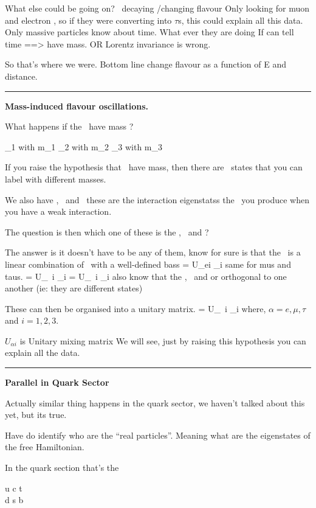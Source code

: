 {What else could be going on?
\nus\ decaying /changing flavour
Only looking for muon and electron \nus, so if they were converting into $\tau$s, this could explain all this data.
Only massive particles know about time. 
What ever they are doing 
If \nus can tell time ==> \nus have mass. 
OR Lorentz invariance is wrong. 

So that's where we were. 
Bottom line \nus change flavour as a function of E and distance. 

\noindent\rule{\textwidth}{1pt}

\textbf{Mass-induced flavour oscillations.}

What happens if the \nus\ have mass ?

\be
\nu_1 \textrm{ with } m_1
\ee
\be
\nu_2 \textrm{ with } m_2
\ee
\be
\nu_3 \textrm{ with } m_3
\ee

If you raise the hypothesis that \nus\ have mass, then there are \nus\ states that you can label with different masses.

We also have \nue, \numu\ and \nutau\ these are the interaction eigenstatss the \nus\ you produce when you have a weak interaction. 

The question is then which one of these is the \nue, \numu\ and \nutau ?

The answer is it doesn't have to be any of them, know for sure is that the \nue\ is a linear combination of \nus\ with a well-defined bass
\be
\nue = U_ei \nu_i
\ee
same for mus and taus. 
\be
\numu = U_{\mu\ i} \nu_i
\ee
\be
\nutau = U_{\tau\ i} \nu_i
\ee
also know that the \nue, \numu\ and \nutau or orthogonal to one another (ie: they are different states) 

These can then be organised into a unitary matrix. 
\be
\nualpha = U_{\alpha\ i} \nu_i
\ee
where, $\alpha = e, \mu, \tau$ and $i = 1,2,3$.

$U_{\alpha i}$ is Unitary mixing matrix
We will see, just by raising this hypothesis you can explain all the data.

\noindent\rule{\textwidth}{1pt}
\textbf{Parallel in Quark Sector}

Actually similar thing happens in the quark sector, we haven't talked about this yet, but its true.

Have do identify who are the ``real particles''. 
Meaning what are the eigenstates of the free Hamiltonian.

In the quark section that's the 

u c t \\
d s b

}
